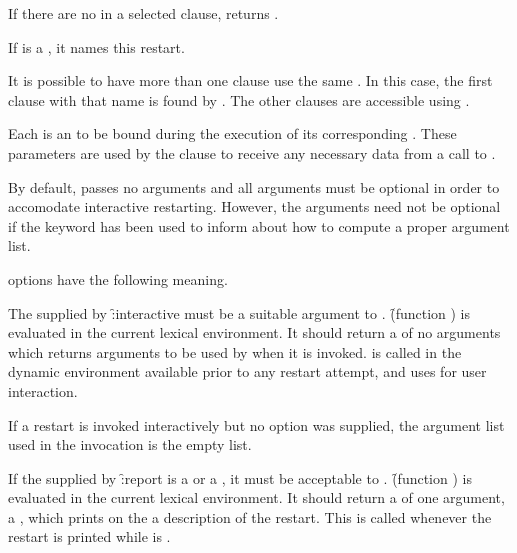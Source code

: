   If there are no  
in a selected clause,  returns \nil.

If  is a , it names this restart.

It is possible to have more than one clause use the same .
In this case, the first clause with that name is found by .  
The other clauses are accessible using .

Each  is an  to be bound during the 
execution of its corresponding .  These parameters are used 
by the  clause to receive any necessary data from a call
to .

By default,  passes no arguments and
all arguments must be optional in order to accomodate interactive
restarting.  However, the arguments need not be optional if the
keyword has been used to inform 
  about how to compute a proper argument list.

 options have the following meaning.
\beginlist
{}
   
The  supplied by \f{:interactive }
must be a suitable argument to . 
\f{(function )} is evaluated in the current lexical
    environment.  It should return a  of no arguments which 
    returns arguments to be used by 
 when it is invoked.
is called in the dynamic
    environment available prior to any restart attempt, and uses 
 for user interaction.

    If a restart is invoked interactively but no  option
    was supplied, the argument list used in the invocation is the empty
    list.


If the  supplied by \f{:report }
is a  or a , it 
must be acceptable to .
\f{(function )} is evaluated in the current lexical
environment.  It should return a  of one
argument, a , which prints on the  a 
description of the restart.  This  is called 
whenever the restart is printed while  is \nil.

